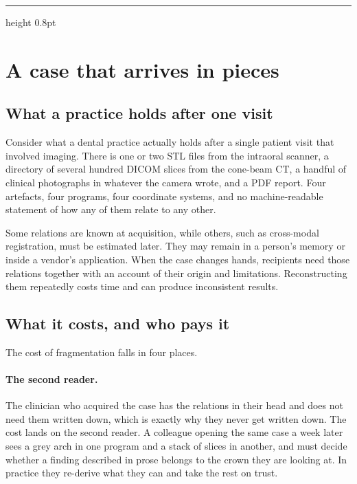 \documentclass[11pt,a4paper]{article}
\begin{document}
\vspace{0.35cm}
\hrule height 0.8pt
\vspace{0.7cm}

\newpage
\setcounter{tocdepth}{1}
{\small\tableofcontents}
\newpage

\section{A case that arrives in pieces}\label{sec:problem}

\subsection{What a practice holds after one visit}

Consider what a dental practice actually holds after a single patient visit that involved
imaging. There is one or two STL files from the intraoral scanner, a directory of several
hundred DICOM slices from the cone-beam CT, a handful of clinical photographs in whatever
the camera wrote, and a PDF report. Four artefacts, four programs, four coordinate
systems, and no machine-readable statement of how any of them relate to any other.

Some relations are known at acquisition, while others, such as cross-modal registration,
must be estimated later. They may remain in a person's memory or inside a vendor's
application. When the case changes hands, recipients need those relations together with
an account of their origin and limitations. Reconstructing them repeatedly costs time and
can produce inconsistent results.

\subsection{What it costs, and who pays it}\label{sec:cost}

The cost of fragmentation falls in four places.

\paragraph{The second reader.} The clinician who acquired the case has the relations in
their head and does not need them written down, which is exactly why they never get
written down. The cost lands on the second reader. A colleague opening the same case a week
later sees a grey arch in one program and a stack of slices in another, and must decide
whether a finding described in prose belongs to the crown they are looking at. In practice
they re-derive what they can and take the rest on trust.
\end{document}
